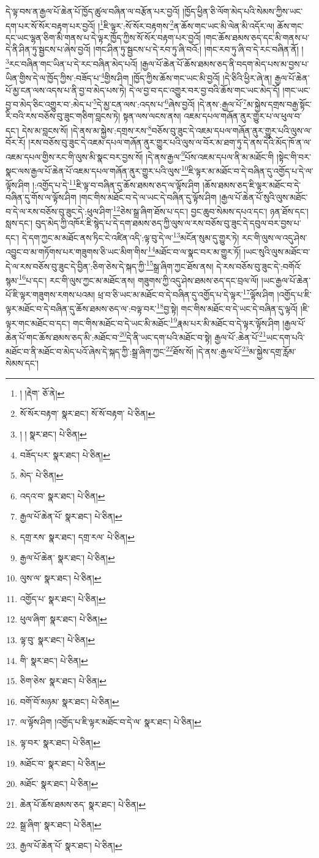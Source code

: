 དེ་ལྟ་བས་ན་རྒྱལ་པོ་ཆེན་པོ་ཁྱོད་ཚུལ་བཞིན་ལ་བརྩོན་པར་བྱའོ། །ཁྱོད་ཕྱིན་ཅི་ལོག་མེད་པའི་སེམས་ཀྱིས་ཡང་དག་པར་སོ་སོར་བརྟག་པར་བྱའོ། །\footnote{། །རྡེག་  ཅོ་ནེ། }ཇི་ལྟར་:སོ་སོར་བརྟགས་\footnote{སོ་སོར་བརྟག་  སྣར་ཐང་། སོ་སོ་བརྟག་  པེ་ཅིན། }ན་ཆོས་གང་ཡང་མི་ལེན་མི་འདོར་ལ། ཆོས་གང་དང་ཡང་ལྷན་ཅིག་མི་གནས་པ་དེ་ལྟར་ཁྱོད་ཀྱིས་སོ་སོར་བརྟག་པར་བྱའོ། །གང་ཆོས་ཐམས་ཅད་དང་མི་གནས་པ་དེ་ནི་ཤིན་ཏུ་སྦྱངས་པ་ཞེས་བྱའོ། །གང་ཤིན་ཏུ་སྦྱངས་པ་དེ་རབ་ཏུ་ཞི་བའོ:། །གང་རབ་ཏུ་ཞི་བ་དེ་རང་བཞིན་ནོ། །\footnote{། །  སྣར་ཐང་།  པེ་ཅིན། }རང་བཞིན་གང་ཡིན་པ་དེ་རང་བཞིན་མེད་པའོ། །རྒྱལ་པོ་ཆེན་པོ་ཆོས་ཐམས་ཅད་ནི་བདག་མེད་པས་མ་བྱས་པ་ཡིན་གྱིས་དེ་ལ་ཁྱོད་ཀྱིས་:བཟོད་པ་\footnote{བཟོད་པར་  སྣར་ཐང་།  པེ་ཅིན། }གྱིས་ཤིག །ཁྱོད་ཀྱིས་ཆོས་གང་ཡང་མི་བྱའོ། །དེ་ཅིའི་ཕྱིར་ཞེ་ན། རྒྱལ་པོ་ཆེན་པོ་མྱ་ངན་ལས་འདས་པ་ནི་བྱ་བ་མེད་པས་ཏེ། དེ་ལ་བྱ་བ་དང་འགྱུར་བར་བྱ་བའི་ཆོས་གང་ཡང་མེད་དོ། །གང་ཡང་བྱ་བ་མེད་ཅིང་འགྱུར་བ་:མེད་པ་\footnote{མེད་  པེ་ཅིན། }དེ་མྱ་ངན་ལས་:འདས་པ་\footnote{འདའ་བ་  སྣར་ཐང་།  པེ་ཅིན། }ཞེས་བྱའོ། །དེ་ནས་:རྒྱལ་པོ་\footnote{རྒྱལ་པོ་ཆེན་པོ་  སྣར་ཐང་།  པེ་ཅིན། }མ་སྐྱེས་དགྲས་བརྒྱ་སྟོང་རི་བའི་རས་བཅོས་བུ་ཟུང་གཅིག་བླངས་ཏེ། སྟན་ལས་ལངས་ནས། འཇམ་དཔལ་གཞོན་ནུར་གྱུར་པ་ལ་ཕུལ་བ་དང་། དེས་མ་བླངས་སོ། །དེ་ནས་མ་སྐྱེས་:དགྲས་རས་\footnote{དགྲ་རས་  སྣར་ཐང་། དགྲ་རལ་  པེ་ཅིན། }བཅོས་བུ་ཟུང་དེ་འཇམ་དཔལ་གཞོན་ནུར་གྱུར་པའི་ལུས་ལ་བོར་རོ། །རས་བཅོས་བུ་ཟུང་དེ་འཇམ་དཔལ་གཞོན་ནུར་གྱུར་པའི་ལུས་ལ་བོར་མ་ཐག་ཏུ་དེ་ནས་དེའི་མོད་ཁོ་ན་ལ་འཇམ་དཔལ་གྱིས་རང་གི་ལུས་མི་སྣང་བར་བྱས་སོ། །དེ་ནས་རྒྱལ་\footnote{རྒྱལ་པོ་ཆེན་  སྣར་ཐང་།  པེ་ཅིན། }པོས་འཇམ་དཔལ་ནི་མ་མཐོང་གི །སྟེང་གི་བར་སྣང་ལས་རྒྱལ་པོ་ཆེན་པོ་འཇམ་དཔལ་གཞོན་ནུར་གྱུར་པའི་ལུས་\footnote{ལུས་ལ་  སྣར་ཐང་།  པེ་ཅིན། }ཇི་ལྟར་མ་མཐོང་བ་དེ་བཞིན་དུ་འགྱོད་པ་དེ་ལ་ལྟོས་ཤིག །:འགྱོད་པ་དེ་\footnote{འགྱོད་པ་  སྣར་ཐང་།  པེ་ཅིན། }ཇི་ལྟ་བ་བཞིན་དུ་ཆོས་ཐམས་ཅད་ལ་ལྟོས་ཤིག །ཆོས་ཐམས་ཅད་ཇི་ལྟར་མཐོང་བ་དེ་བཞིན་དུ་གོས་ལ་ལྟོས་ཤིག །གང་གིས་མཐོང་བ་དེ་ལ་ཡང་དེ་བཞིན་དུ་ལྟོས་ཤིག །རྒྱལ་པོ་ཆེན་པོ་སུའི་ལུས་མཐོང་བ་དེ་ལ་རས་བཅོས་བུ་ཟུང་དེ་:ཕུལ་ཤིག་\footnote{ཕུལ་ཞིག་  སྣར་ཐང་།  པེ་ཅིན། }ཅེས་སྒྲ་ཞིག་ཐོས་པ་དང་། བྱང་ཆུབ་སེམས་དཔའ་དང་། ཉན་ཐོས་དང་། སླས་དང་། བུད་མེད་ཀྱི་འཁོར་ཇི་སྙེད་པ་དེ་དག་ཐམས་ཅད་ཀྱི་ལུས་ལ་རས་བཅོས་བུ་ཟུང་དེ་དབུལ་བར་བྱས་པ་དང་། དེ་དག་ཀྱང་མ་མཐོང་ནས་ཏིང་ངེ་འཛིན་འདི་:ལྟ་བུ་དེ་ལ་\footnote{ལྟ་བུ་  སྣར་ཐང་།  པེ་ཅིན། }མངོན་སུམ་དུ་གྱུར་ཏེ། རང་གི་ལུས་ལ་འདུ་ཤེས་འབྱུང་བ་མ་གཏོགས་པར་གཟུགས་ཅི་ཡང་མིག་གིས་\footnote{གི་  སྣར་ཐང་།  པེ་ཅིན། }མཐོང་བ་ལ་སྣང་བར་མ་གྱུར་ཏོ། །ཡང་སུའི་ལུས་མཐོང་བ་དེ་ལ་རས་བཅོས་བུ་ཟུང་དེ་བྱིན་:ཅིག་ཅེས་དེ་སྐད་ཀྱི་\footnote{ཅིག་ཅེས་  སྣར་ཐང་།  པེ་ཅིན། }སྒྲ་ཞིག་ཀྱང་ཐོས་ནས། དེ་རས་བཅོས་བུ་ཟུང་དེ་:བགོའོ་སྙམ་\footnote{བགོ་བོ་མཉམ་  སྣར་ཐང་།  པེ་ཅིན། }པ་དང་། རང་གི་ལུས་ཀྱང་མ་མཐོང་ནས། གཟུགས་ཀྱི་འདུ་ཤེས་ཐམས་ཅད་དང་བྲལ་ལོ། །ཡང་རྒྱལ་པོ་ཆེན་པོ་ཇི་ལྟར་གཟུགས་རགས་པའམ། ཕྲ་བ་ཅི་ཡང་མ་མཐོང་བ་དེ་བཞིན་དུ་འགྱོད་པ་དེ་ལྟར་\footnote{ལ་ལྟོས་ཤིག །འགྱོད་པ་ཇི་ལྟར་མཐོང་བ་དེ་ལ་  སྣར་ཐང་།  པེ་ཅིན། }ལྟོས་ཤིག །འགྱོད་པ་ཇི་ལྟར་མཐོང་བ་དེ་བཞིན་དུ་ཆོས་ཐམས་ཅད་ལ་:བལྟ་བར་\footnote{ལྟ་བར་  སྣར་ཐང་།  པེ་ཅིན། }བྱ་སྟེ། གང་གིས་མཐོང་བ་དེ་ཡང་དེ་བཞིན་དུ་ལྟའོ། །ཇི་ལྟར་གང་མཐོང་བ་དང་། གང་གིས་མཐོང་བ་དེ་ཡང་མི་མཐོང་\footnote{མཐོང་བ་  སྣར་ཐང་།  པེ་ཅིན། }རྣམ་པར་མི་མཐོང་བ་དེ་ལྟར་ལྟོས་ཤིག །རྒྱལ་པོ་ཆེན་པོ་གང་ཆོས་ཐམས་ཅད་མི་:མཐོང་བ་\footnote{མཐོང་  སྣར་ཐང་།  པེ་ཅིན། }དེ་ནི་ཡང་དག་པའི་མཐོང་བ་སྟེ། རྒྱལ་པོ་:ཆེན་པོ་\footnote{ཆེན་པོ་ཆོས་ཐམས་ཅད་  སྣར་ཐང་།  པེ་ཅིན། }ཡང་དག་པའི་མཐོང་བ་ནི་མཐོང་བ་མེད་པའོ་ཞེས་དེ་སྐད་ཀྱི་:སྒྲ་ཞིག་ཀྱང་\footnote{སྒྲ་ཞིག་  སྣར་ཐང་།  པེ་ཅིན། }ཐོས་སོ། །དེ་ནས་:རྒྱལ་པོ་\footnote{རྒྱལ་པོ་ཆེན་པོ་  སྣར་ཐང་།  པེ་ཅིན། }མ་སྐྱེས་དགྲ་རློམ་སེམས་དང་། 